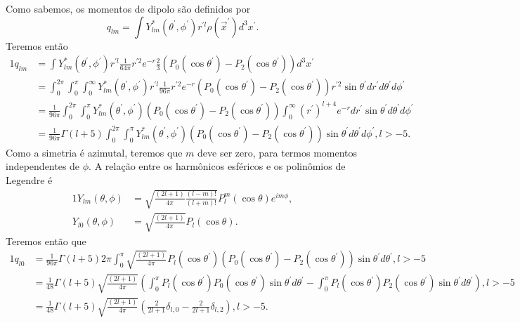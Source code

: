 \documentclass{article}
\begin{document}
Como sabemos, os momentos de dipolo são definidos por
\begin{equation}
 q_{lm} = \int Y^{*}_{lm}(\theta^{\prime},\phi^{\prime})r^{\prime l}\rho(\vec{x}^{\prime}) d^{3}x^{\prime}\mathrm{.}
\end{equation}
Teremos então
\begin{alignat}{1}
 q_{lm} &= \int Y^{*}_{lm}(\theta^{\prime},\phi^{\prime})r^{\prime l}\frac{1}{64\pi}r^{\prime 2} e^{-r}
 \frac{2}{3}\left( P_0(\cos{\theta^{\prime}}) - P_2(\cos{\theta^{\prime}}) \right) d^{3}x^{\prime} \\
 &= \int_{0}^{2 \pi} \! \int_{0}^{\pi} \! \int_{0}^{\infty} Y^{*}_{lm}(\theta^{\prime},\phi^{\prime})r^{\prime l}\frac{1}{96\pi}r^{\prime 2} e^{-r}
 \left( P_0(\cos{\theta^{\prime}}) - P_2(\cos{\theta^{\prime}}) \right) r^{\prime 2} \sin{\theta^{\prime}}dr^{\prime} d\theta^{\prime} d\phi^{\prime} \\
 &=\frac{1}{96\pi} \int_{0}^{2 \pi} \! \int_{0}^{\pi} Y^{*}_{lm}(\theta^{\prime},\phi^{\prime})\left( P_0(\cos{\theta^{\prime}}) - P_2(\cos{\theta^{\prime}}) \right)
 \int_{0}^{\infty} (r^{\prime})^{l + 4} e^{-r} dr^{\prime} \sin{\theta^{\prime}} d\theta^{\prime} d\phi^{\prime}\\
 &= \frac{1}{96\pi} \Gamma(l+5) \int_{0}^{2 \pi} \! \int_{0}^{\pi} Y^{*}_{lm}(\theta^{\prime},\phi^{\prime})
 \left( P_0(\cos{\theta^{\prime}}) - P_2(\cos{\theta^{\prime}}) \right) \sin{\theta^{\prime}} d\theta^{\prime} d\phi^{\prime}, l > -5 \mathrm{.}
\end{alignat}
Como a simetria é azimutal, teremos que $m$ deve ser zero, para termos momentos independentes de $\phi$. A relação entre os harmônicos esféricos e os polinômios de
Legendre é
\begin{alignat}{1}
 Y_{lm}(\theta,\phi) &= \sqrt{\frac{(2l + 1)}{4 \pi}\frac{(l-m)!}{(l+m)!}} P_{l}^{m}(\cos{\theta}) e^{i m \phi}\mathrm{,}\\
 Y_{l0}(\theta,\phi) &= \sqrt{\frac{(2l + 1)}{4 \pi}} P_{l}(\cos{\theta}) \mathrm{.}
\end{alignat}
Teremos então que
\begin{alignat}{1}
 q_{l0} &= \frac{1}{96\pi} \Gamma(l+5) 2\pi \int_{0}^{\pi} \sqrt{\frac{(2l + 1)}{4 \pi}} P_{l}(\cos{\theta^{\prime}})
 \left( P_0(\cos{\theta^{\prime}}) - P_2(\cos{\theta^{\prime}}) \right) \sin{\theta^{\prime}} d\theta^{\prime}, l > -5 \\
 &= \frac{1}{48} \Gamma(l+5) \sqrt{\frac{(2l + 1)}{4 \pi}}
 \left( \int_{0}^{\pi} P_{l}(\cos{\theta^{\prime}}) P_0(\cos{\theta^{\prime}})\sin{\theta^{\prime}} d\theta^{\prime} -
 \int_{0}^{\pi} P_{l}(\cos{\theta^{\prime}}) P_2(\cos{\theta^{\prime}}) \sin{\theta^{\prime}} d\theta^{\prime} \right), l > -5 \\
 &= \frac{1}{48} \Gamma(l+5) \sqrt{\frac{(2l + 1)}{4 \pi}}
 \left( \frac{2}{2l + 1}\delta_{l,0} - \frac{2}{2l + 1} \delta_{l,2} \right), l > -5 \mathrm{.}
\end{alignat}
\end{document}
